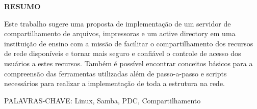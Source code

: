 \begin{center}
\textbf{RESUMO}
\end{center}
\singlespacing

Este trabalho sugere uma proposta de implementação de um servidor de compartilhamento de arquivos, impressoras e um active
directory em uma instituição de ensino com a missão de facilitar o compartilhamento dos recursos de rede disponíveis e tornar mais seguro e confiável o controle de 
acesso dos usuários a estes recursos. Também é possível encontrar conceitos básicos para a compreensão das ferramentas 
utilizadas além de passo-a-passo e scripts necessários para realizar a implementação de toda a estrutura na rede.

\noindent PALAVRAS-CHAVE: Linux, Samba, PDC, Compartilhamento
